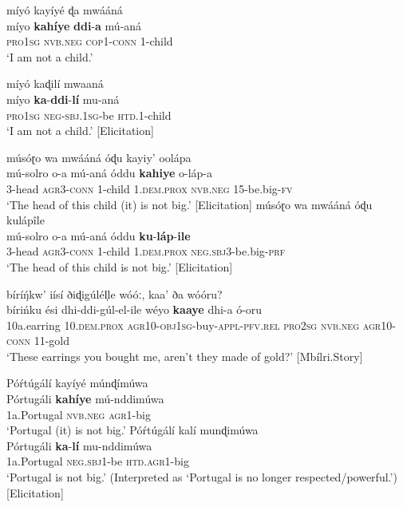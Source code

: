 \documentclass[output=paper,colorlinks=true, citecolor=brown,draftmode]{langscibook}
\begin{document}
\ea\label{ex:cuw:22}
    \ea\label{ex:cuw:22a} míyó kayíyé ɖa mwááná\\
        \gll  míyo \textbf{kahíye} \textbf{ddi}{}-\textbf{a} mú-aná \\
              \textsc{pro1sg} \textsc{nvb.neg} \textsc{cop1-conn} 1{}-child\\
        \glt ‘I am not a child.’
\newpage

    \ex\label{ex:cuw:22b} míyó kaɖilí mwaaná \\
        \gll  míyo \textbf{ka}{}-\textbf{ddi}{}-\textbf{lí} mu-aná \\
              \textsc{pro1sg} \textsc{neg-}\textsc{sbj.1sg-}be \textsc{htd.1}{}-child\\
        \glt ‘I am not a child.’ [Elicitation]
    \z
\z 

\ea\label{ex:cuw:23}
    \ea\label{ex:cuw:23a} músóɽo wa mwááná óɖu kayiy’ oolápa\\ 
        \gll mú-solro o-a mú-aná óddu \textbf{kahiye} o-láp-a \\
              3-head \textsc{agr}3-\textsc{conn} 1-child 1.\textsc{dem.prox} \textsc{nvb.neg} 15{}-be.big-\textsc{fv}\\
        \glt  ‘The head of this child (it) is not big.’ [Elicitation]
    \ex\label{ex:cuw:23b} músóɽo wa mwááná óɖu kulápîle \\
        \gll  mú-solro o-a mú-aná óddu \textbf{ku}-\textbf{láp}-\textbf{ile}\\
              3-head \textsc{agr}3-\textsc{conn} 1-child 1.\textsc{dem.prox} \textsc{neg.sbj3}{}-be.big-\textsc{prf}\\
        \glt  ‘The head of this child is not big.’ [Elicitation]
    \z
\z 

{\ea\label{ex:cuw:24} bírí\'{ŋ}kw’ iísí ðiɖigúlél̩le wóóː, kaa’ ða wóóru? \\
    \gll  bírińku ési dhi-ddi-gúl-el-ile wéyo \textbf{kaaye} dhi-a ó-oru\\
          10a.earring 10.\textsc{dem.prox} \textsc{agr}10-\textsc{obj}1\textsc{sg}{}-buy-\textsc{appl}{}-\textsc{pfv}.\textsc{rel} \textsc{pro2sg} \textsc{nvb.neg} \textsc{agr}10-\textsc{conn} 11-gold \\
    \glt ‘These earrings you bought me, aren’t they made of gold?’ [Mbílri.Story]
\z }

\ea\label{ex:cuw:25}
    \ea\label{ex:cuw:25a} Póŕtúgálí kayíyé múnɖímúwa\\
        \gll  Pórtugáli \textbf{kahíye} mú-nddimúwa\\
              1a.Portugal \textsc{nvb.neg} \textsc{agr1}-big\\
        \glt ‘Portugal (it) is not big.’
    \ex\label{ex:cuw:25b} Póŕtúgálí kalí munɖimúwa \\
        \gll Pórtugáli \textbf{ka}{}-\textbf{lí} mu-nddimúwa \\
             1a.Portugal \textsc{neg.sbj1-}be \textsc{htd.agr1}{}-big \\
        \glt ‘Portugal is not big.’ (Interpreted as ‘Portugal is no longer respected/powerful.’) [Elicitation]
    \z
\z 
\end{document}
